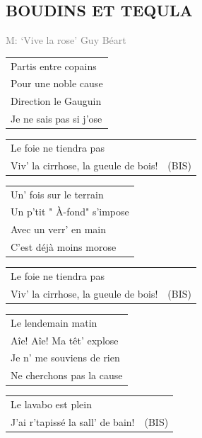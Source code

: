 \documentclass{article}
\begin{document}
\subsection*{BOUDINS ET TEQULA}
\textcolor{gray}{\small M: ‘Vive la rose’ Guy Béart}
\par
\begin{flushleft}
\begin{tabularx}{0.8\textwidth} {
   >{\raggedright\arraybackslash}X}
Partis entre copains\\
Pour une noble cause\\
Direction le Gauguin\\
Je ne sais pas si j’ose\\
\end{tabularx}
\begin{tabularx}{0.8\textwidth} {
   >{\raggedright\arraybackslash}X | c}
Le foie ne tiendra pas & \\
Viv’ la cirrhose, la gueule de bois! & (BIS)\\
\end{tabularx}
\end{flushleft}
\begin{flushleft}
\begin{tabularx}{0.8\textwidth} {
   >{\raggedright\arraybackslash}X}
Un’ fois sur le terrain \\
Un p’tit " À-fond" s’impose \\
Avec un verr’ en main \\
C’est déjà moins morose \\
\end{tabularx}
\begin{tabularx}{0.8\textwidth} {
   >{\raggedright\arraybackslash}X | c}
Le foie ne tiendra pas & \\
Viv’ la cirrhose, la gueule de bois! & (BIS)\\
\end{tabularx}
\end{flushleft}
\begin{flushleft}
\begin{tabularx}{0.8\textwidth} {
   >{\raggedright\arraybackslash}X}
Le lendemain matin \\
Aîe! Aîe! Ma têt’ explose \\
Je n’ me souviens de rien \\
Ne cherchons pas la cause \\
\end{tabularx}
\begin{tabularx}{0.8\textwidth} {
   >{\raggedright\arraybackslash}X | c}
Le lavabo est plein & \\
J’ai r’tapissé la sall’ de bain! & (BIS)\\
\end{tabularx}
\end{flushleft}
\end{document}
